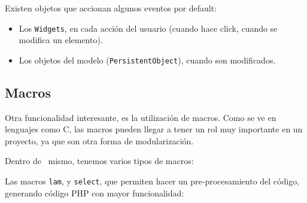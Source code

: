 Existen objetos que accionan algunos eventos por default:
\begin{itemize}
\item Los \verb"Widgets", en cada acción del usuario (cuando hace click, cuando se modifica un elemento).
\item Los objetos del modelo (\verb"PersistentObject"), cuando son modificados.
\end{itemize}




\subsection{Macros}
\label{sub-macros}
Otra funcionalidad interesante, es la utilización de macros. Como se ve en lenguajes como C, las macros pueden llegar a tener un rol muy importante en un proyecto, ya que son otra forma de modularización.

Dentro de \PWB \ mismo, tenemos varios tipos de macros:

Las macros \verb"lam", y \verb"select", que permiten hacer un pre-procesamiento del código, generando código PHP con mayor funcionalidad:

